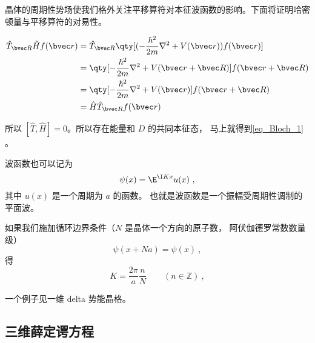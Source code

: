 晶体的周期性势场使我们格外关注平移算符对本征波函数的影响。下面将证明哈密顿量与平移算符的对易性。

\begin{align}
\hat{T}_{\bvec R} \hat{H} f(\bvec r) &= \hat{T}_{\bvec R} \qty[(-\frac{\hbar^2}{2m}\nabla^2+V(\bvec r) ) f(\bvec r)] \\
&= \qty[-\frac{\hbar^2}{2m}\nabla^2+V(\bvec r + \bvec R)]  f(\bvec r + \bvec R)\\
&= \qty[-\frac{\hbar^2}{2m}\nabla^2+V(\bvec r) ] f(\bvec r+ \bvec R)\\
& = \hat{H} \hat{T}_{\bvec R} f(\bvec r)
\end{align}

所以 $[\hat{T},\hat{H}] = 0$。所以存在能量和 $D$ 的共同本征态， 马上就得到\autoref{eq_Bloch_1} 。

波函数也可以记为
\begin{equation}
\psi(x) = \E^{\I K x} u(x)~,
\end{equation}
其中 $u(x)$ 是一个周期为 $a$ 的函数。 也就是波函数是一个振幅受周期性调制的平面波。

如果我们施加循环边界条件（$N$ 是晶体一个方向的原子数， 阿伏伽德罗常数数量级）
\begin{equation}
\psi(x+Na) = \psi(x)~,
\end{equation}
得
\begin{equation}
K = \frac{2\pi}{a} \frac{n}{N} \qquad (n \in \mathbb Z)~,
\end{equation}

一个例子见一维 delta 势能晶格。

\subsection{三维薛定谔方程}

